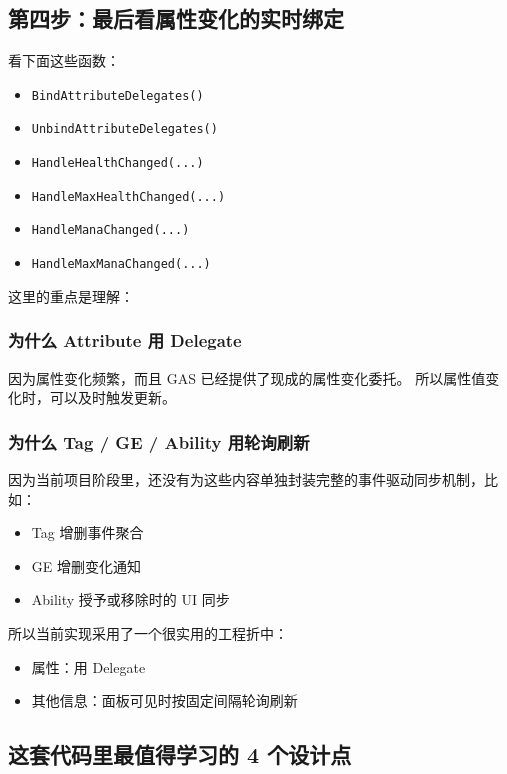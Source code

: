 \subsection{第四步：最后看属性变化的实时绑定}
看下面这些函数：

\begin{itemize}
	\item \texttt{BindAttributeDelegates()}
	\item \texttt{UnbindAttributeDelegates()}
	\item \texttt{HandleHealthChanged(...)}
	\item \texttt{HandleMaxHealthChanged(...)}
	\item \texttt{HandleManaChanged(...)}
	\item \texttt{HandleMaxManaChanged(...)}
\end{itemize}

这里的重点是理解：

\subsubsection{为什么 Attribute 用 Delegate}
因为属性变化频繁，而且 GAS 已经提供了现成的属性变化委托。  
所以属性值变化时，可以及时触发更新。

\subsubsection{为什么 Tag / GE / Ability 用轮询刷新}
因为当前项目阶段里，还没有为这些内容单独封装完整的事件驱动同步机制，比如：

\begin{itemize}
	\item Tag 增删事件聚合
	\item GE 增删变化通知
	\item Ability 授予或移除时的 UI 同步
\end{itemize}

所以当前实现采用了一个很实用的工程折中：

\begin{itemize}
	\item 属性：用 Delegate
	\item 其他信息：面板可见时按固定间隔轮询刷新
\end{itemize}

\subsection{这套代码里最值得学习的 4 个设计点}


